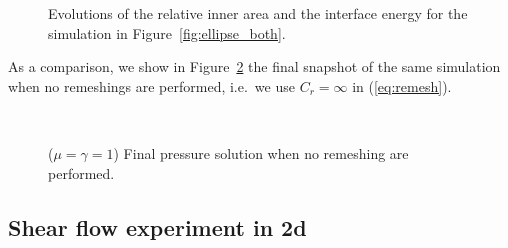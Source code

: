 \documentclass[a4paper,12pt,onecolumn]{article}
\begin{document}
\begin{figure}[htbp]
  \centering
  \caption{Evolutions of the relative inner area and the 
interface energy for the simulation in Figure~\ref{fig:ellipse_both}.}
  \label{fig:ellipse_both_volumes}
\end{figure}
As a comparison, we show in Figure~\ref{fig:ellipse_smooth} the final snapshot
of the same simulation when no remeshings are performed, i.e.\ we use $C_r=
\infty$ in (\ref{eq:remesh}). 
\begin{figure}[htbp]
  \centering
  \\
  \caption{($\mu=\gamma=1$) Final pressure solution when no remeshing are performed.}
  \label{fig:ellipse_smooth}
\end{figure}

\subsection{Shear flow experiment in 2d}
\end{document}
